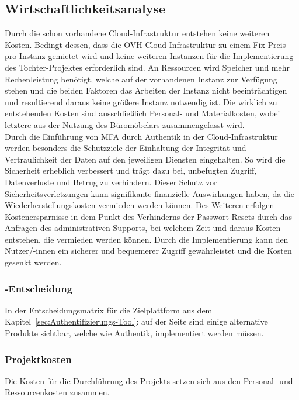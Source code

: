 \subsection{Wirtschaftlichkeitsanalyse}
\label{sec:Wirtschaftlichkeitsanalyse}
Durch die schon vorhandene Cloud-Infrastruktur entstehen keine weiteren Kosten. Bedingt dessen, dass die 
OVH-Cloud-Infrastruktur zu einem Fix-Preis pro Instanz gemietet wird und keine weiteren Instanzen für die Implementierung 
des Tochter-Projektes erforderlich sind. An Ressourcen wird Speicher und mehr Rechenleistung benötigt, welche 
auf der vorhandenen Instanz zur Verfügung stehen und die beiden Faktoren das Arbeiten der Instanz nicht 
beeinträchtigen und resultierend daraus keine größere Instanz notwendig ist. Die wirklich zu entstehenden Kosten 
sind ausschließlich Personal- und Materialkosten, wobei letztere aus der Nutzung des Büromöbelars zusammengefasst wird. 
\\Durch die Einführung von \acs*{MFA} durch Authentik in der Cloud-Infrastruktur werden besonders die Schutzziele der 
Einhaltung der Integrität und Vertraulichkeit der Daten auf den jeweiligen Diensten eingehalten. So wird die Sicherheit 
erheblich verbessert und trägt dazu bei, unbefugten Zugriff, Datenverluste und Betrug zu verhindern. Dieser Schutz 
vor Sicherheitsverletzungen kann signifikante finanzielle Auswirkungen haben, da die Wiederherstellungskosten vermieden 
werden können. Des Weiteren erfolgen Kostenersparnisse in dem Punkt des Verhinderns der Passwort-Resets durch das Anfragen des 
administrativen Supports, bei welchem Zeit und daraus Kosten entstehen, die vermieden werden können. Durch die Implementierung 
kann den Nutzer/-innen ein sicherer und bequemerer Zugriff gewährleistet und die Kosten gesenkt werden.


\subsubsection{-Entscheidung}
\label{sec:MakeOrBuyEntscheidung}
In der Entscheidungsmatrix für die Zielplattform aus dem Kapitel~\ref{sec:Authentifizierungs-Tool}: 
auf der Seite \pageref{sec:Authentifizierungs-Tool} sind einige alternative Produkte sichtbar, welche wie Authentik, 
implementiert werden müssen.


\subsubsection{Projektkosten}
\label{sec:Projektkosten}
Die Kosten für die Durchführung des Projekts setzen sich aus den Personal- und Ressourcenkosten zusammen.   

